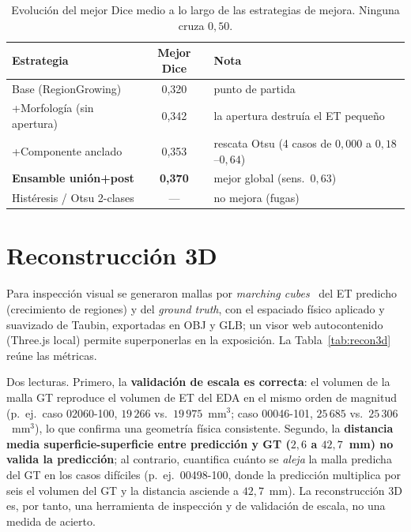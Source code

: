 \documentclass[conference]{IEEEtran}
\begin{document}
\begin{table}[h]
\centering
\caption{Evolución del mejor Dice medio a lo largo de las estrategias de mejora. Ninguna
cruza $0{,}50$.}
\label{tab:evolucion}
\begin{tabularx}{\columnwidth}{lcX}
\toprule
Estrategia & Mejor Dice & Nota \\
\midrule
Base (RegionGrowing)    & 0,320 & punto de partida \\
+Morfología (sin apertura) & 0,342 & la apertura destruía el ET pequeño \\
+Componente anclado     & 0,353 & rescata Otsu (4 casos de $0{,}000$ a $0{,}18$--$0{,}64$) \\
\textbf{Ensamble unión+post} & \textbf{0,370} & mejor global (sens.\ $0{,}63$) \\
Histéresis / Otsu 2-clases & --- & no mejora (fugas) \\
\bottomrule
\end{tabularx}
\end{table}

\section{Reconstrucción 3D}
Para inspección visual se generaron mallas por \textit{marching
cubes}~\cite{lorensen1987marching} del ET predicho (crecimiento de
regiones) y del \textit{ground truth}, con el espaciado físico
aplicado y suavizado de Taubin, exportadas en OBJ y GLB; un visor
web autocontenido (Three.js local) permite superponerlas en la
exposición. La Tabla~\ref{tab:recon3d} reúne las métricas.

Dos lecturas. Primero, la \textbf{validación de escala es
correcta}: el volumen de la malla GT reproduce el volumen de ET del
EDA en el mismo orden de magnitud (p.~ej.\ caso 02060-100,
$19\,266$ vs.\ $19\,975$~mm$^3$; caso 00046-101, $25\,685$ vs.\
$25\,306$~mm$^3$), lo que confirma una geometría física consistente.
Segundo, la \textbf{distancia media superficie-superficie entre
predicción y GT ($2{,}6$ a $42{,}7$~mm) no valida la predicción};
al contrario, cuantifica cuánto se \emph{aleja} la malla predicha
del GT en los casos difíciles (p.~ej.\ 00498-100, donde la
predicción multiplica por seis el volumen del GT y la distancia
asciende a $42{,}7$~mm). La reconstrucción 3D es, por tanto, una
herramienta de inspección y de validación de escala, no una medida
de acierto.
\end{document}
